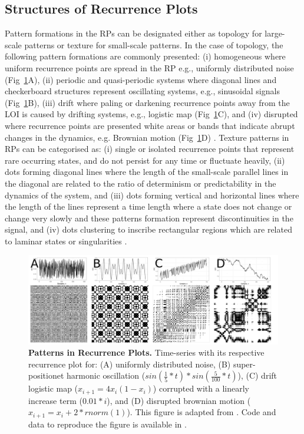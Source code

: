 \documentclass[fleqn,10pt]{wlscirep}
\begin{document}
\subsection*{Structures of Recurrence Plots}
Pattern formations in the RPs can be designated either 
as topology for large-scale patterns or texture for small-scale patterns.
In the case of topology, the following pattern formations are commonly presented:
(i) homogeneous where uniform recurrence points are spread in the RP e.g., 
uniformly distributed noise (Fig~\ref{fig:rp2}A), 
(ii) periodic and quasi-periodic systems where diagonal lines and 
checkerboard structures represent oscillating systems, e.g., sinusoidal 
signals (Fig~\ref{fig:rp2}B), 
(iii) drift where paling or darkening recurrence points away from 
the LOI is caused by drifting systems, 
e.g., logistic map (Fig~\ref{fig:rp2}C), and
(iv) disrupted where recurrence points are presented white areas or 
bands that indicate abrupt changes in the dynamics, e.g. Brownian motion 
(Fig~\ref{fig:rp2}D) \cite{eckmann1987, marwan2015}.
Texture patterns in RPs can be categorised as:
(i) single or isolated recurrence points that represent rare occurring states, 
and do not persist for any time or fluctuate heavily,
(ii) dots forming diagonal lines where the length of the small-scale parallel 
lines in the diagonal are related to the ratio of determinism or predictability 
in the dynamics of the system, and
(iii) dots forming vertical and horizontal lines where the length of the 
lines represent a time length where a state does not change or change very 
slowly and these patterns formation represent discontinuities in the signal, 
and (iv) dots clustering to inscribe rectangular regions which are related 
to laminar states or singularities \cite{marwan2015}.
\begin{figure}[ht]
\centering
\includegraphics[width=1.0\textwidth]{rpsp}
    \caption{
	{\bf Patterns in Recurrence Plots.} 
	Time-series with its respective recurrence plot for:
	(A) uniformly distributed noise,
	(B) super-positionet harmonic oscillation 
	($sin( \frac{1}{5}*t) * sin( \frac{5}{100}*t) $),
	(C) drift logistic map ($x_{i+1} = 4 x_i (1- x_i) $) corrupted 
	with a linearly increase term ($0.01*i$), and
	(D) disrupted brownian motion  ($x_{i+1} = x_i + 2*rnorm(1) $).
	This figure is adapted from \cite{marwan2015}.
	Code and data to reproduce the figure is available in \cite{srep2020}.
	}
    \label{fig:rp2}
\end{figure}
\end{document}
